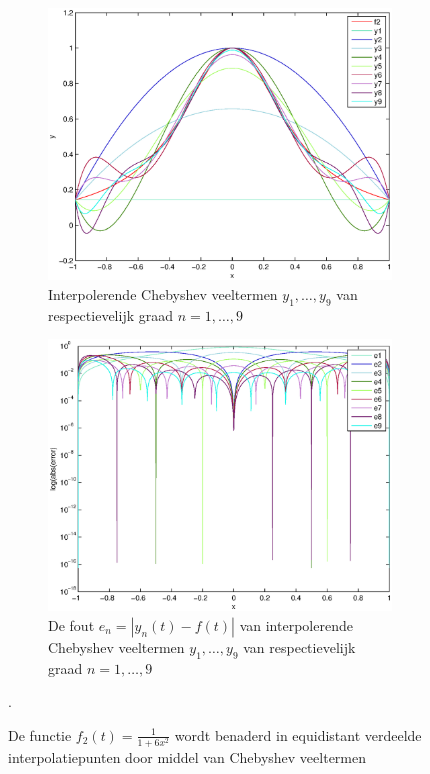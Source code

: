 \documentclass[a4paper]{article}
\begin{document}
\begin{figure}
    \centering
    \begin{subfigure}[b]{\textwidth}
        \centering
        \includegraphics[width=\textwidth]{Jona/linspace_f2_interpolation.eps}
        \caption{Interpolerende Chebyshev veeltermen $y_{1},\dots,y_{9}$ van respectievelijk graad $n=1,\dots,9$}
        \label{fig:lin_f2_interpol}
        \vspace*{1cm}
    \end{subfigure}
    \begin{subfigure}[b]{\textwidth}
        \centering
        \includegraphics[width=\textwidth]{Jona/linspace_f2_error.eps}
        \caption{De fout $e_{n} = |y_{n}(t)-f(t)|$ van interpolerende Chebyshev veeltermen $y_{1},\dots,y_{9}$ van respectievelijk graad $n=1,\dots,9$}
        \label{fig:lin_f2_error}
        \vspace*{1cm}
    \end{subfigure}
    \hfill
    \caption{De functie $f_{2}(t) = \frac{1}{1+6x^{2}}$ wordt benaderd in equidistant verdeelde interpolatiepunten door middel van Chebyshev veeltermen}\label{fig:lin_f2}.
\end{figure}
\end{document}
